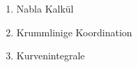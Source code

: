 \begin{enumerate}
	\item Nabla Kalkül
	\item Krummlinige Koordination
	\item Kurvenintegrale
\end{enumerate}